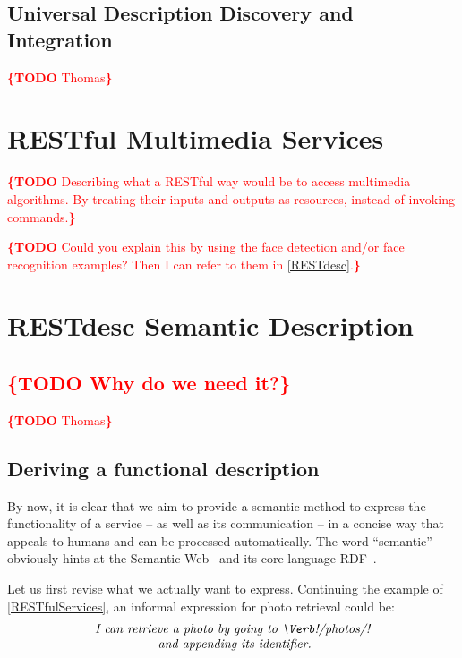 \documentclass[runningheads,a4paper, twocolumn]{llncs}
\newcommand{\todo}[1]{\noindent\textcolor{red}{{\bf \{TODO} #1{\bf \}}}}
\begin{document}
\subsection{Universal Description Discovery and Integration}
\todo{Thomas}

\section{RESTful Multimedia Services}
\label{RESTfulServices}
\todo{Describing what a RESTful way would be to access multimedia algorithms. By treating their inputs and outputs as resources, instead of invoking commands.}

\todo{Could you explain this by using the face detection and/or face recognition examples? Then I can refer to them in \autoref{RESTdesc}.}

\section{RESTdesc Semantic Description}
\label{RESTdesc}
\subsection{\todo{Why do we need it?}}
\todo{Thomas}

\subsection{Deriving a functional description}
By now, it is clear that we aim to provide a semantic method to express the functionality of a service -- as well as its communication -- in a concise way that appeals to humans and can be processed automatically. The word ``semantic'' obviously hints at the Semantic Web~\cite{SemanticWeb} and its core language RDF~\cite{RDF}.

Let us first revise what we actually want to express. Continuing the example of \autoref{RESTfulServices}, an informal expression for photo retrieval could be:
\begin{multline}\label{eq:Informal}
	\textit{I can retrieve a photo by going to \Verb!/photos/!}\\[-.3em]
	\textit{ and appending its identifier.}
\end{multline}
\end{document}
